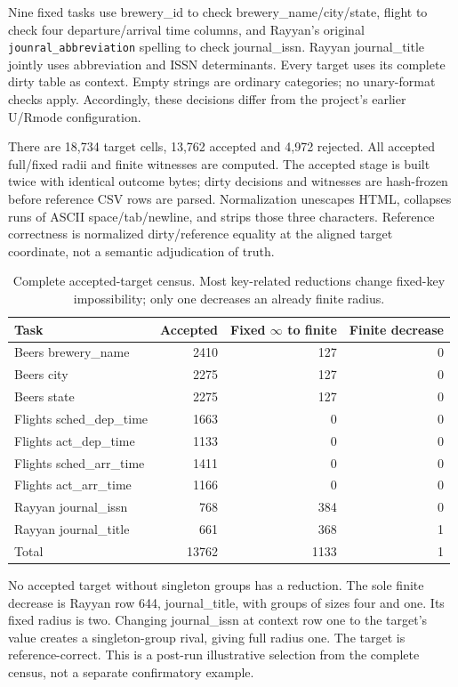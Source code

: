 \documentclass[11pt]{article}
\newcommand{\INF}{\infty}
\begin{document}
Nine fixed tasks use brewery\_id to check brewery\_name/city/state, flight to
check four departure/arrival time columns, and Rayyan's original
\texttt{jounral\_abbreviation} spelling to check journal\_issn.
Rayyan journal\_title jointly uses abbreviation and ISSN determinants.
Every target uses its complete dirty table as context. Empty strings are
ordinary categories; no unary-format checks apply. Accordingly, these
decisions differ from the project's earlier U/Rmode configuration.

There are 18,734 target cells, 13,762 accepted and 4,972 rejected. All accepted
full/fixed radii and finite witnesses are computed. The accepted stage is
built twice with identical outcome bytes; dirty decisions and witnesses are
hash-frozen before reference CSV rows are parsed. Normalization unescapes HTML,
collapses runs of ASCII space/tab/newline, and strips those three characters.
Reference correctness is normalized dirty/reference equality at the aligned
target coordinate, not a semantic adjudication of truth.

\begin{table}[H]
\centering\small
\begin{tabular}{lrrr}
\toprule
Task & Accepted & Fixed $\INF$ to finite & Finite decrease\\
\midrule
Beers brewery\_name&2410&127&0\\
Beers city&2275&127&0\\
Beers state&2275&127&0\\
Flights sched\_dep\_time&1663&0&0\\
Flights act\_dep\_time&1133&0&0\\
Flights sched\_arr\_time&1411&0&0\\
Flights act\_arr\_time&1166&0&0\\
Rayyan journal\_issn&768&384&0\\
Rayyan journal\_title&661&368&1\\
\midrule
Total&13762&1133&1\\
\bottomrule
\end{tabular}
\caption{Complete accepted-target census. Most key-related reductions change
fixed-key impossibility; only one decreases an already finite radius.}
\end{table}

No accepted target without singleton groups has a reduction. The sole finite
decrease is Rayyan row 644, journal\_title, with groups of sizes four and one.
Its fixed radius is two. Changing journal\_issn at context row one to the
target's value creates a singleton-group rival, giving full radius one.
The target is reference-correct. This is a post-run illustrative selection
from the complete census, not a separate confirmatory example.
\end{document}
